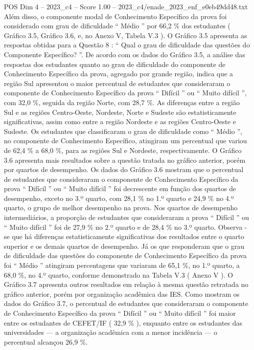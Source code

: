 \begin{textsample}{POS Dim 4 – 2023\_c4 – Score 1.00 – 2023\_c4/enade\_2023\_enf\_e0eb49dd48.txt}
Além disso, o componente modal de Conhecimento Específico da prova foi considerado com grau de dificuldade “ Médio ” por 66,2 \% dos estudantes ( Gráfico 3.5, Gráfico 3.6, e, no Anexo V, Tabela V.3 ).
O Gráfico 3.5 apresenta as respostas obtidas para a Questão 8 : “ Qual o grau de dificuldade das questões do Componente Específico? ”.
De acordo com os dados do Gráfico 3.5, a análise das respostas dos estudantes quanto ao grau de dificuldade do componente de Conhecimento Específico da prova, agregado por grande região, indica que a região Sul apresentou o maior percentual de estudantes que consideraram o componente de Conhecimento Específico da prova “ Difícil ” ou “ Muito difícil ”, com 32,0 \%, seguida da região Norte, com 28,7 \%.
As diferenças entre a região Sul e as regiões Centro-Oeste, Nordeste, Norte e Sudeste são estatisticamente significativas, assim como entre a região Nordeste e as regiões Centro-Oeste e Sudeste.
Os estudantes que classificaram o grau de dificuldade como “ Médio ”, no componente de Conhecimento Específico, atingiram um percentual que variou de 62,4 \% a 68,0 \%, para as regiões Sul e Nordeste, respectivamente.
O Gráfico 3.6 apresenta mais resultados sobre a questão tratada no gráfico anterior, porém por quartos de desempenho.
Os dados do Gráfico 3.6 mostram que o percentual de estudantes que consideraram o componente de Conhecimento Específico da prova “ Difícil ” ou “ Muito difícil ” foi decrescente em função dos quartos de desempenho, exceto no 3.º quarto, com 28,1 \% no 1.º quarto e 24,9 \% no 4.º quarto, o grupo de melhor desempenho na prova.
Nos quartos de desempenho intermediários, a proporção de estudantes que consideraram a prova “ Difícil ” ou “ Muito difícil ” foi de 27,9 \% no 2.º quarto e de 28,4 \% no 3.º quarto.
Observa -se que há diferenças estatisticamente significativas dos resultados entre o quarto superior e os demais quartos de desempenho.
Já os que responderam que o grau de dificuldade das questões do componente de Conhecimento Específico da prova foi “ Médio ” atingiram percentagens que variaram de 65,1 \%, no 1.º quarto, a 68,0 \%, no 4.º quarto, conforme demonstrado na Tabela V.3 ( Anexo V ).
O Gráfico 3.7 apresenta outros resultados em relação à mesma questão retratada no gráfico anterior, porém por organização acadêmica das IES.
Como mostram os dados do Gráfico 3.7, o percentual de estudantes que consideraram o componente de Conhecimento Específico da prova “ Difícil ” ou “ Muito difícil ” foi maior entre os estudantes de CEFET/IF ( 32,9 \% ), enquanto entre os estudantes das universidades — a organização acadêmica com a menor incidência — o percentual alcançou 26,9 \%.

\end{textsample}

